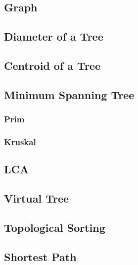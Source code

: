 \documentclass[10pt,a4paper]{article}
\newcommand{\codedir}{../code/}
\newcommand{\code}[2][]{%
}
\begin{document}
\clearpage
{}
\begin{multicols}{2}

\section{Graph}

\subsection{Diameter of a Tree}
\code{Diameter.cpp}

\subsection{Centroid of a Tree}
\code{Centroid.cpp}

\subsection{Minimum Spanning Tree}

\subsubsection{Prim}
\code{Minimum Spanning Tree(Prim).cpp}

\subsubsection{Kruskal}
\code{Minimum Spanning Tree(Kruskal).cpp}

\subsection{LCA}
\code{LCA(Binary Lifting).cpp}

\subsection{Virtual Tree}
\code{VT.cpp}

\subsection{Topological Sorting}
\code{Topological Sorting.cpp}

\subsection{Shortest Path}


\end{multicols}
\end{document}
